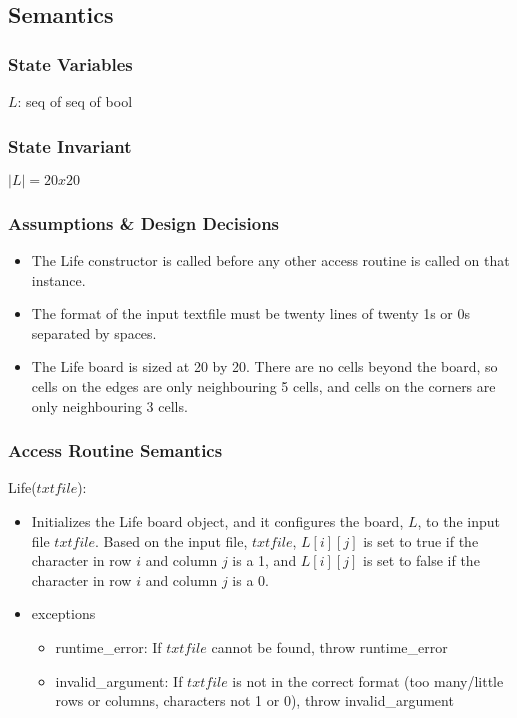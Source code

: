 \documentclass[12pt]{article}
\begin{document}
\subsection* {Semantics}

\subsubsection* {State Variables}

$L$: seq of seq of bool\\

\subsubsection* {State Invariant}

$|L| = 20 x 20$\\

\subsubsection* {Assumptions \& Design Decisions}

\begin{itemize}
\item The Life constructor is called before any other
access routine is called on that instance.

\item The format of the input textfile must be twenty lines of twenty 1s or 0s separated by spaces. 

\item The Life board is sized at 20 by 20. There are no cells beyond the board, so cells on the edges are only neighbouring 5 cells, and cells on the corners are only neighbouring 3 cells.

\end{itemize}

\subsubsection* {Access Routine Semantics}

\noindent Life($txtfile$):
\begin{itemize}
\item Initializes the Life board object, and it configures the board, $L$, to the input file $txtfile$. Based on the input file, $txtfile$, $L[i][j]$ is set to true if the character in row $i$ and column $j$ is a 1, and $L[i][j]$ is set to false if the character in row $i$ and column $j$ is a 0.

\item exceptions
\begin{itemize}
	\item runtime\_error: If $txtfile$ cannot be found, throw runtime\_error
	\item invalid\_argument: If $txtfile$ is not in the correct format (too many/little rows or columns, characters not 1 or 0), throw invalid\_argument
\end{itemize} 

\end{itemize}
\end{document}
